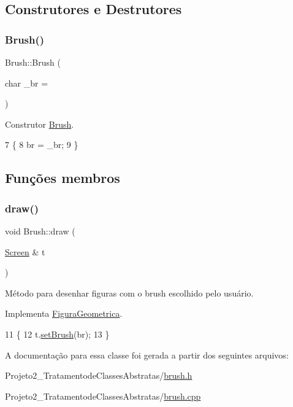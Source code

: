 \subsection{Construtores e Destrutores}
\mbox{\label{class_brush_a5ded381f29fa4566fbce96f623baecab}} 
\subsubsection{\texorpdfstring{Brush()}{Brush()}}
{\footnotesize\ttfamily Brush\+::\+Brush (\begin{DoxyParamCaption}\item[{char}]{\+\_\+br = {\ttfamily \textquotesingle{}~\textquotesingle{}} }\end{DoxyParamCaption})}



Construtor \mbox{\hyperlink{class_brush}{Brush}}. 


\begin{DoxyCode}
7                     \{
8     br = \_br;
9 \}
\end{DoxyCode}


\subsection{Funções membros}
\mbox{\label{class_brush_ad12c371aba8d8770df593ef94ae14dd0}} 
\subsubsection{\texorpdfstring{draw()}{draw()}}
{\footnotesize\ttfamily void Brush\+::draw (\begin{DoxyParamCaption}\item[{\mbox{\hyperlink{class_screen}{Screen}} \&}]{t }\end{DoxyParamCaption})\hspace{0.3cm}{\ttfamily [virtual]}}



Método para desenhar figuras com o brush escolhido pelo usuário. 



Implementa \mbox{\hyperlink{class_figura_geometrica_a8ee8dedc060b6059a805ea091aef2c41}{Figura\+Geometrica}}.


\begin{DoxyCode}
11                          \{
12     t.\mbox{\hyperlink{class_screen_aebc4eb6cb5acf15a0f04c1494622ab23}{setBrush}}(br);
13 \}
\end{DoxyCode}


A documentação para essa classe foi gerada a partir dos seguintes arquivos\+:\begin{DoxyCompactItemize}
\item 
Projeto2\+\_\+\+Tratamentode\+Classes\+Abstratas/\mbox{\hyperlink{brush_8h}{brush.\+h}}\item 
Projeto2\+\_\+\+Tratamentode\+Classes\+Abstratas/\mbox{\hyperlink{brush_8cpp}{brush.\+cpp}}\end{DoxyCompactItemize}

